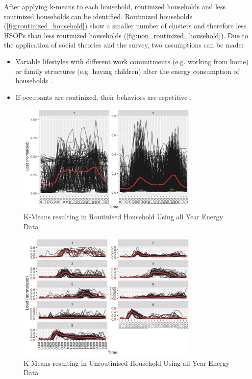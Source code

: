 After applying k-means to each household, routinized households and less routinized households can be identified.
Routinized households (\autoref{fig:routinized_household}) show a smaller number of clusters and therefore less HSOPs than less routinized households (\autoref{fig:non_routinized_household}).
Due to the application of social theories and the survey, two assumptions can be made:
\begin{itemize}
    \item Variable lifestyles with different work commitments (e.g. working from home) or family structures (e.g. having children) alter the energy consumption of households \cite{KUR-HBP}.
    \item If occupants are routinized, their behaviors are repetitive \cite{BRE-EWP}.
\end{itemize}

\begin{figure}
    \centering
    \includegraphics[width=0.8\textwidth]{figures/malatesta_hsop/malatesta_routinisedHousehold.jpg}
    \caption{K-Means resulting in Routinised Household Using all Year Energy Data \cite{MAL-HBP}}
    \label{fig:routinized_household}
\end{figure}

\begin{figure}
    \centering
    \includegraphics[width=0.8\textwidth]{figures/malatesta_hsop/malatesta_unroutinisedHousehold.jpg}
    \caption{K-Means resulting in Unroutinised Household Using all Year Energy Data \cite{MAL-HBP}}
    \label{fig:non_routinized_household}
\end{figure}

